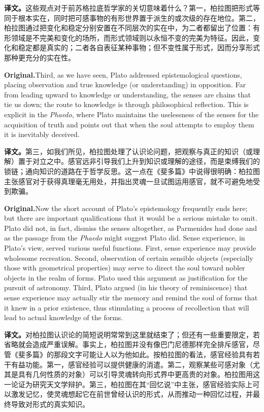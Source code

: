 \documentclass[UTF8]{ctexart}
\newcommand{\orig}{\par\noindent\textbf{Original.}\quad}
\newcommand{\zh}{\par\noindent\textbf{译文。}\quad}
\begin{document}
\zh 这些观点对于前苏格拉底哲学家的关切意味着什么？第一，柏拉图把形式等同于根本实在，同时把可感事物的有形世界置于派生的或次级的存在地位。第二，柏拉图通过把变化和稳定分别安置在不同层次的实在中，为二者都留出了位置：有形领域是不完美和变化的场所，而形式领域则以永恒不变的完美为特征。因此，变化和稳定都是真实的；二者各自表征某种事物；但不变性属于形式，因而分享形式那种更充分的实在性。

\orig Third, as we have seen, Plato addressed epistemological questions, placing observation and true knowledge (or understanding) in opposition. Far from leading upward to knowledge or understanding, the senses are chains that tie us down; the route to knowledge is through philosophical reflection. This is explicit in the \textit{Phaedo}, where Plato maintains the uselessness of the senses for the acquisition of truth and points out that when the soul attempts to employ them it is inevitably deceived.

\zh 第三，如我们所见，柏拉图处理了认识论问题，把观察与真正的知识（或理解）置于对立之中。感官远非引导我们上升到知识或理解的途径，而是束缚我们的锁链；通向知识的道路在于哲学反思。这一点在《斐多篇》中说得很明确：柏拉图主张感官对于获得真理毫无用处，并指出灵魂一旦试图运用感官，就不可避免地受到欺骗。

\orig Now the short account of Plato's epistemology frequently ends here; but there are important qualifications that it would be a serious mistake to omit. Plato did not, in fact, dismiss the senses altogether, as Parmenides had done and as the passage from the \textit{Phaedo} might suggest Plato did. Sense experience, in Plato's view, served various useful functions. First, sense experience may provide wholesome recreation. Second, observation of certain sensible objects (especially those with geometrical properties) may serve to direct the soul toward nobler objects in the realm of forms. Plato used this argument as justification for the pursuit of astronomy. Third, Plato argued (in his theory of reminiscence) that sense experience may actually stir the memory and remind the soul of forms that it knew in a prior existence, thus stimulating a process of recollection that will lead to actual knowledge of the forms.

\zh 对柏拉图认识论的简短说明常常到这里就结束了；但还有一些重要限定，若省略就会造成严重误解。事实上，柏拉图并没有像巴门尼德那样完全排斥感官，尽管《斐多篇》的那段文字可能让人以为他如此。按柏拉图的看法，感官经验具有若干有益功能。第一，感官经验可以提供健康的消遣。第二，观察某些可感对象（尤其是具有几何性质的对象）可以引导灵魂转向形式界中更高贵的对象。柏拉图用这一论证为研究天文学辩护。第三，柏拉图在其“回忆说”中主张，感官经验实际上可以激发记忆，使灵魂想起它在前世曾经认识的形式，从而推动一种回忆过程，并最终导致对形式的真实知识。
\end{document}
